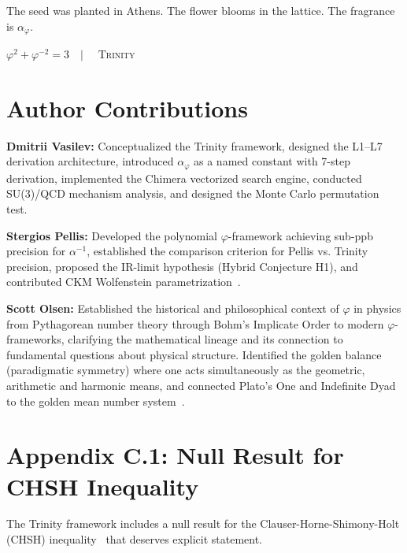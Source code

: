\documentclass[10pt,a4paper]{article}
\begin{document}
The seed was planted in Athens.
The flower blooms in the lattice.
The fragrance is $\alpha_\varphi$.

\begin{center}
$\varphi^2 + \varphi^{-2} = 3 \quad | \quad$ \textsc{Trinity}
\end{center}

\section*{Author Contributions}

\textbf{Dmitrii Vasilev:} Conceptualized the Trinity framework, designed the L1--L7 derivation
architecture, introduced $\alpha_\varphi$ as a named constant with 7-step derivation, implemented
the Chimera vectorized search engine, conducted SU(3)/QCD mechanism analysis, and designed the
Monte Carlo permutation test.

\textbf{Stergios Pellis:} Developed the polynomial $\varphi$-framework achieving sub-ppb precision
for $\alpha^{-1}$, established the comparison criterion for Pellis vs. Trinity precision,
proposed the IR-limit hypothesis (Hybrid Conjecture H1), and contributed CKM Wolfenstein
parametrization~\cite{pellis2021}.

\textbf{Scott Olsen:} Established the historical and philosophical context of $\varphi$ in physics
from Pythagorean number theory through Bohm's Implicate Order to modern $\varphi$-frameworks,
clarifying the mathematical lineage and its connection to fundamental questions about
physical structure. Identified the golden balance (paradigmatic symmetry) where one acts
simultaneously as the geometric, arithmetic and harmonic means, and connected Plato's
One and Indefinite Dyad to the golden mean number system~\cite{olsen2026}.

\section*{Appendix C.1: Null Result for CHSH Inequality}

The Trinity framework includes a null result for the Clauser-Horne-Shimony-Holt (CHSH)
inequality~\cite{chsh1969} that deserves explicit statement.
\end{document}
